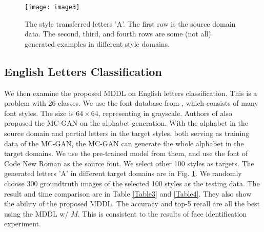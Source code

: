 \documentclass{article}
\begin{document}
\begin{figure}[!tb]
	\vspace{-0.5cm}
    \centerline{\texttt{[image: image3]}}
    \caption{The style transferred letters 'A'. The first row is the source domain data. The second, third, and fourth rows are some (not all) generated examples in different style domains. }
    \label{A-GAN}
\end{figure}

\subsection{English Letters Classification}

We then examine the proposed MDDL on English letters classification. This is a problem with 26 classes. We use the font database from \cite{azadi2018multi}, which consists of many font styles. The size is $64\times 64$, representing in grayscale. Authors of \cite{azadi2018multi} also proposed the MC-GAN on the alphabet generation. With the alphabet in the source domain and partial letters in the target styles, both serving as training data of the MC-GAN, the MC-GAN can generate the whole alphabet in the target domains. We use the pre-trained model from them, and use the font of Code New Roman as the source font. We select other 100 styles as targets. The generated letters 'A' in different target domains are in Fig. \ref{A-GAN}. We randomly choose 300 groundtruth images of the selected 100 styles as the testing data. The result and time comparison are in Table \ref{Table3} and \ref{Table4}. They also show the ability of the proposed MDDL. The accuracy and top-5 recall are all the best using the MDDL w/ $M$. This is consistent to the results of face identification experiment.
\end{document}
